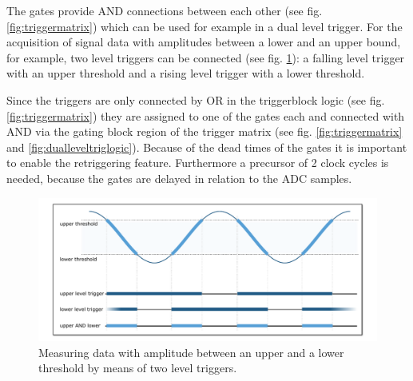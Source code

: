             The gates provide AND connections between each other (see fig. \ref{fig:triggermatrix}) which can be used for example in a dual level trigger. For the acquisition of signal data with amplitudes between a lower and an upper bound, for example, two level triggers can be connected (see fig. \ref{fig:dualleveltrig}): a falling level trigger with an upper threshold and a rising level trigger with a lower threshold.\par
            Since the triggers are only connected by OR in the triggerblock logic (see fig. \ref{fig:triggermatrix}) they are assigned to one of the gates each and connected with AND via the gating block region of the trigger matrix (see fig. \ref{fig:triggermatrix} and \ref{fig:dualleveltriglogic}). Because of the dead times of the gates it is important to enable the retriggering feature. Furthermore a precursor of 2 clock cycles is needed, because the gates are delayed in relation to the ADC samples.\par
            \begin{figure}[ht]
                \begin{center}
                    \includegraphics[width=\textwidth]{figures/dual_level_triggering.pdf}
                    \caption{\label{fig:dualleveltrig}Measuring data with amplitude between an upper and a lower threshold by means of two level triggers.}
                \end{center}
            \end{figure}	
            
